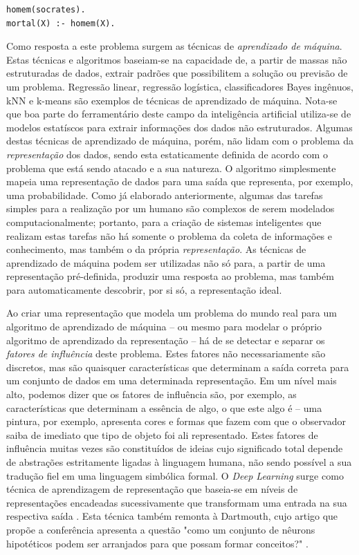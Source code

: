 \documentclass[12pt, a4paper]{article}
\begin{document}
\bigskip
\begin{lstlisting}[caption={Exemplo do uso da linguagem Prolog para modelar a famosa proposição da mortalidade de Sócrates.}, captionpos=b]
homem(socrates).
mortal(X) :- homem(X).
\end{lstlisting}

Como resposta a este problema surgem as técnicas de \emph{aprendizado de máquina}. Estas técnicas e algoritmos
baseiam-se na capacidade de, a partir de massas não estruturadas de dados, extrair padrões que
possibilitem a solução ou previsão de um problema.
Regressão linear, regressão logística, classificadores Bayes ingênuos, 
kNN e k-means são exemplos de técnicas de aprendizado de máquina.
Nota-se que boa parte do ferramentário deste campo da inteligência artificial utiliza-se de modelos estatíscos para extrair informações
dos dados não estruturados. Algumas destas técnicas de aprendizado de máquina, porém, não lidam com o problema da \emph{representação}
dos dados, sendo esta estaticamente definida de acordo com o problema que está sendo atacado e a sua natureza. O algoritmo simplesmente mapeia uma representação de dados para uma saída que representa, por exemplo, uma probabilidade.
Como já elaborado anteriormente, algumas das tarefas simples para a realização por um humano são complexos de serem modelados computacionalmente;
portanto, para a criação de sistemas inteligentes que realizam estas tarefas não há somente o problema da coleta de informações e conhecimento,
mas também o da própria \emph{representação}. 
As técnicas de aprendizado de máquina podem ser utilizadas não só para, a partir de uma representação pré-definida, produzir uma resposta ao problema, mas também para automaticamente descobrir, por si só, a representação ideal.

Ao criar uma representação que modela um problema do mundo real para um algoritmo de aprendizado de máquina -- ou mesmo para modelar o próprio algoritmo de aprendizado da representação -- há de se detectar e separar os \emph{fatores de influência} deste problema. Estes fatores não necessariamente são discretos, mas são quaisquer características que determinam a saída correta para um conjunto de dados em uma determinada representação. Em um nível mais alto, podemos dizer que os fatores de influência são, por exemplo, as características que determinam a essência de algo, o que este algo é -- uma pintura, por exemplo, apresenta cores e formas que fazem com que o observador saiba de imediato que tipo de objeto foi ali representado. Estes fatores de influência muitas vezes são constituídos de ideias cujo significado total depende de abstrações estritamente ligadas à linguagem humana, não sendo possível a sua tradução fiel em uma linguagem simbólica formal. O \emph{Deep Learning} surge como técnica de aprendizagem de representação que baseia-se em níveis de representações encadeadas sucessivamente que transformam uma entrada na sua respectiva saída \cite{Goodfellow-et-al-2016}. 
Esta técnica também remonta à Dartmouth, cujo artigo que propõe a conferência apresenta a questão "como um conjunto de nêurons hipotéticos podem ser arranjados para que possam formar conceitos?" \cite{dartmouth}.
\end{document}
